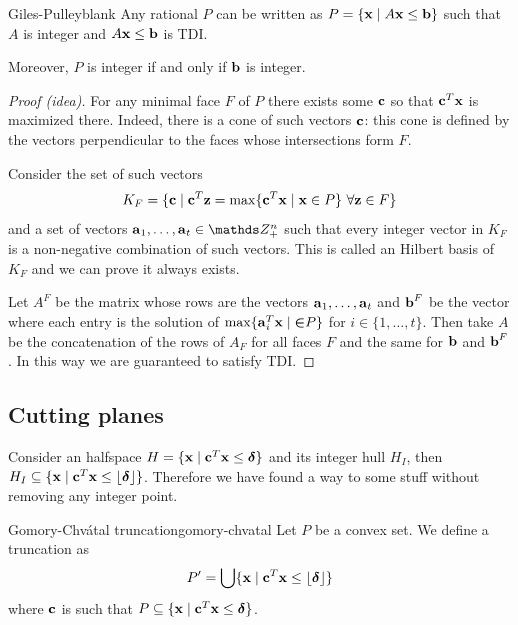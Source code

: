 \documentclass[12pt]{extarticle}
\renewcommand{\vec}[1]{\bvec{#1}}
\begin{document}
\begin{theorem}{Giles-Pulleyblank}{}
	Any rational $P$ can be written as $P = \{ \vec x \mid A \vec x \leq \vec b \}$ such that $A$ is
	integer and $A \vec x \leq \vec b$ is TDI.

	Moreover, $P$ is integer if and only if $\vec b$ is integer.
\end{theorem}

\begin{proof}[Proof (idea)]
	For any minimal face $F$ of $P$ there exists some $\vec c$ so that $\vec c^T \vec x$ is maximized
	there.
	Indeed, there is a cone of such vectors $\vec c$: this cone is defined by the vectors
	perpendicular to the faces whose intersections form $F$.

	Consider the set of such vectors
	\begin{equation}
		K_F = \{ \vec c \mid \vec c^T \vec z = \max \{ \vec c^T \vec x \mid \vec x \in P\} \ \forall \vec z \in
		F \}
	\end{equation}
	and a set of vectors $\vec a_1, \dots, \vec a_t \in \Z^n_+$ such that
	every integer vector in $K_F$ is a non-negative combination of such vectors.
	This is called an Hilbert basis of $K_F$ and we can prove it always exists.

	Let $A^F$ be the matrix whose rows are the vectors $\vec a_1, \dots, \vec a_t$ and $\vec b^F$ be
	the vector where each entry is the solution of $\max \{\vec a^T_i \vec x \mid \vec \in P\}$ for
	$i \in \{1, \dots, t\}$.
	Then take $A$ be the concatenation of the rows of $A_F$ for all faces $F$ and the same for $\vec b$ and
	$\vec b^F$.
	In this way we are guaranteed to satisfy TDI.
\end{proof}

\subsection{Cutting planes}

Consider an halfspace $H = \{ \vec x \mid \vec c^T \vec x \leq \vec \delta \}$ and its integer hull
$H_I$, then $H_I \subseteq \{ \vec x \mid \vec c^T \vec x \leq \floor{\vec \delta} \}$.
Therefore we have found a way to  some stuff without removing any integer point.

\begin{definition}{Gomory-Chvátal truncation}{gomory-chvatal}
	Let $P$ be a convex set.
	We define a truncation as
	\begin{equation}
		P' = \bigcup \{\vec x \mid \vec c^T \vec x \leq \floor{\vec \delta} \}
	\end{equation}
	where $\vec c$ is such that $P \subseteq \{ \vec x \mid \vec c^T \vec x \leq \vec \delta \}$.
\end{definition}
\end{document}
